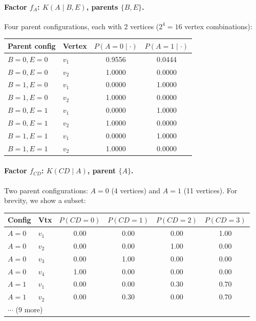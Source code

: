 \documentclass{article}
\begin{document}
\paragraph{Factor $f_A$: $K(A \mid B, E)$, parents $\{B, E\}$.}
Four parent configurations, each with 2 vertices ($2^4 = 16$ vertex combinations):
\begin{center}
\begin{tabular}{llcc}
\toprule
\textbf{Parent config} & \textbf{Vertex} & $P(A{=}0 \mid \cdot)$ & $P(A{=}1 \mid \cdot)$ \\
\midrule
$B{=}0, E{=}0$ & $v_1$ & 0.9556 & 0.0444 \\
$B{=}0, E{=}0$ & $v_2$ & 1.0000 & 0.0000 \\
\midrule
$B{=}1, E{=}0$ & $v_1$ & 0.0000 & 1.0000 \\
$B{=}1, E{=}0$ & $v_2$ & 1.0000 & 0.0000 \\
\midrule
$B{=}0, E{=}1$ & $v_1$ & 0.0000 & 1.0000 \\
$B{=}0, E{=}1$ & $v_2$ & 1.0000 & 0.0000 \\
\midrule
$B{=}1, E{=}1$ & $v_1$ & 0.0000 & 1.0000 \\
$B{=}1, E{=}1$ & $v_2$ & 1.0000 & 0.0000 \\
\bottomrule
\end{tabular}
\end{center}

\paragraph{Factor $f_{CD}$: $K(CD \mid A)$, parent $\{A\}$.}
Two parent configurations: $A{=}0$ (4 vertices) and $A{=}1$ (11 vertices).
For brevity, we show a subset:
\begin{center}
\begin{tabular}{llcccc}
\toprule
\textbf{Config} & \textbf{Vtx} & $P(CD{=}0)$ & $P(CD{=}1)$ & $P(CD{=}2)$ & $P(CD{=}3)$ \\
\midrule
$A{=}0$ & $v_1$ & 0.00 & 0.00 & 0.00 & 1.00 \\
$A{=}0$ & $v_2$ & 0.00 & 0.00 & 1.00 & 0.00 \\
$A{=}0$ & $v_3$ & 0.00 & 1.00 & 0.00 & 0.00 \\
$A{=}0$ & $v_4$ & 1.00 & 0.00 & 0.00 & 0.00 \\
\midrule
$A{=}1$ & $v_1$ & 0.00 & 0.00 & 0.30 & 0.70 \\
$A{=}1$ & $v_2$ & 0.00 & 0.30 & 0.00 & 0.70 \\
\multicolumn{2}{l}{$\cdots$ (9 more)} \\
\bottomrule
\end{tabular}
\end{center}
\end{document}
